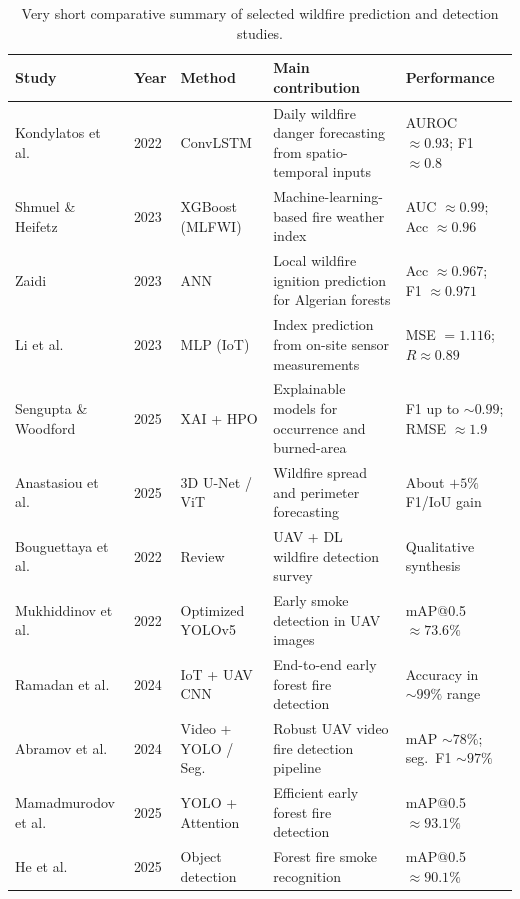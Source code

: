 \documentclass[11pt,a4paper]{report}
\begin{document}
\begin{table}[h!]
\centering
\caption{Very short comparative summary of selected wildfire prediction and detection studies.}
\label{tab:lit-summary}
\small
\begin{tabular}{@{}llp{2.4cm}p{4.3cm}p{3.2cm}@{}}
\toprule
Study & Year & Method & Main contribution & Performance \\
\midrule
Kondylatos et al.~\cite{kondylatos2022} & 2022 & ConvLSTM & Daily wildfire danger forecasting from spatio-temporal inputs & AUROC $\approx 0.93$; F1 $\approx 0.8$ \\
Shmuel \& Heifetz~\cite{shmuel2023} & 2023 & XGBoost (MLFWI) & Machine-learning-based fire weather index & AUC $\approx 0.99$; Acc $\approx 0.96$ \\
Zaidi~\cite{zaidi2023} & 2023 & ANN & Local wildfire ignition prediction for Algerian forests & Acc $\approx 0.967$; F1 $\approx 0.971$ \\
Li et al.~\cite{li2023} & 2023 & MLP (IoT) & Index prediction from on-site sensor measurements & MSE $= 1.116$; $R \approx 0.89$ \\
Sengupta \& Woodford~\cite{sengupta2025} & 2025 & XAI + HPO & Explainable models for occurrence and burned-area & F1 up to $\sim 0.99$; RMSE $\approx 1.9$ \\
Anastasiou et al.~\cite{anastasiou2025} & 2025 & 3D U-Net / ViT & Wildfire spread and perimeter forecasting & About $+5\%$ F1/IoU gain \\
Bouguettaya et al.~\cite{bouguettaya2022} & 2022 & Review & UAV + DL wildfire detection survey & Qualitative synthesis \\
Mukhiddinov et al.~\cite{mukhiddinov2022} & 2022 & Optimized YOLOv5 & Early smoke detection in UAV images & mAP@0.5 $\approx 73.6\%$ \\
Ramadan et al.~\cite{ramadan2024} & 2024 & IoT + UAV CNN & End-to-end early forest fire detection & Accuracy in $\sim 99\%$ range \\
Abramov et al.~\cite{abramov2024} & 2024 & Video + YOLO / Seg. & Robust UAV video fire detection pipeline & mAP $\sim 78\%$; seg.\ F1 $\sim 97\%$ \\
Mamadmurodov et al.~\cite{mamadmurodov2025} & 2025 & YOLO + Attention & Efficient early forest fire detection & mAP@0.5 $\approx 93.1\%$ \\
He et al.~\cite{he2025} & 2025 & Object detection & Forest fire smoke recognition & mAP@0.5 $\approx 90.1\%$ \\
\bottomrule
\end{tabular}
\end{table}
\end{document}
